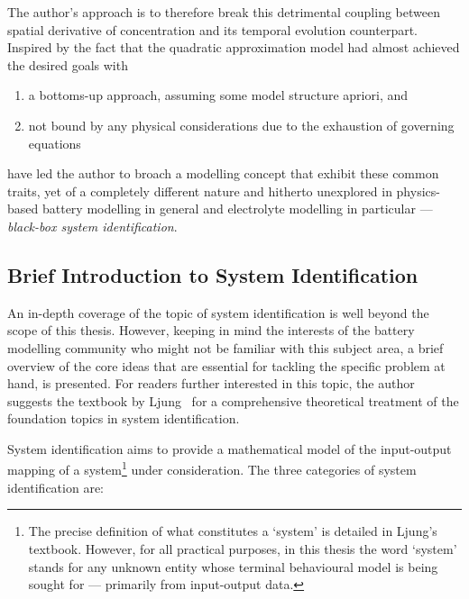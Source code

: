 The author's  approach is to  therefore break this detrimental  coupling between
spatial  derivative of  concentration  and its  temporal evolution  counterpart.
Inspired by the fact that the  quadratic approximation model had almost achieved
the desired goals with
\begin{enumerate}[label=\emph{\alph*})]
    \item a bottoms-up approach, \ie{} assuming some model structure apriori, and
    \item not bound by any physical considerations due to the exhaustion of governing equations
\end{enumerate}
have led  the author  to broach  a modelling concept  that exhibit  these common
traits,  yet  of  a  completely  different nature  and  hitherto  unexplored  in
physics-based  battery  modelling  in   general  and  electrolyte  modelling  in
particular --- \emph{black-box system identification}.

\subsection{Brief Introduction to System Identification}\label{subsec:introsysid}

An in-depth  coverage of the topic  of system identification is  well beyond the
scope of  this thesis.  However, keeping  in mind the  interests of  the battery
modelling community  who might not be  familiar with this subject  area, a brief
overview of the core ideas that  are essential for tackling the specific problem
at hand, is presented. For readers  further interested in this topic, the author
suggests the textbook by  Ljung~\cite{Ljung1999} for a comprehensive theoretical
treatment of the foundation topics in system identification.

System identification aims  to provide a mathematical model  of the input-output
mapping  of  a system\footnote{The  precise  definition  of what  constitutes  a
`system' is detailed  in Ljung's textbook. However, for  all practical purposes,
in this  thesis the word `system'  stands for any unknown  entity whose terminal
behavioural model  is being  sought for ---  primarily from  input-output data.}
under consideration. The three categories of system identification are:


